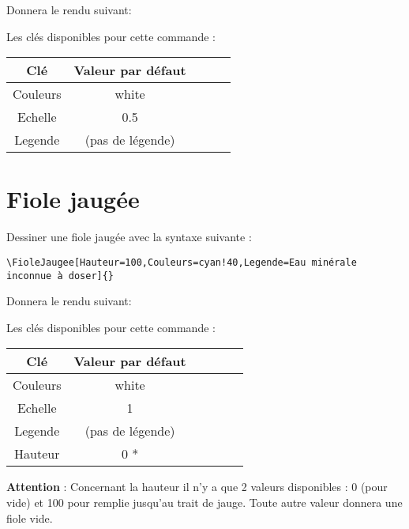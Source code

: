 \documentclass[a4paper,12pt,dvipsnames]{report}
\newcommand{\crh}{\\ \hline}
\newcommand{\important}[1]{%
\vspace{0.5cm}

\begin{imp} 
#1 
\end{imp}
\vspace{0.5cm}%
}
\begin{document}
Donnera le rendu suivant:
\begin{center}
\Becher[Couleurs=magenta!88,Echelle=1,Legende=bécher 2 contenant une solution de permanganate]{}
\end{center}

\vspace{1cm}

Les clés disponibles pour cette commande :
\begin{center}
\begin{tabularx}{0.5\textwidth}{|C|C|}
\hline 
\textbf{Clé} & \textbf{Valeur par défaut} \crh
Couleurs & white \crh
Echelle & 0.5 \crh
Legende & {} (pas de légende) \crh
\end{tabularx}
\end{center}

\newpage
\section{Fiole jaugée}

Dessiner une fiole jaugée avec la syntaxe suivante :
\vspace{2cm}

\begin{lstlisting}[style=A]
\FioleJaugee[Hauteur=100,Couleurs=cyan!40,Legende=Eau minérale inconnue à doser]{}
\end{lstlisting}
\vspace{2cm}

Donnera le rendu suivant:
\begin{center}
\FioleJaugee[Hauteur=100,Couleurs=cyan!40,Legende=Eau minérale inconnue à doser]{} \FioleJaugee[Hauteur=20,Couleurs=cyan!40,Legende=Ceci est une fiole vide]{}

\end{center}
\vspace{2cm}


Les clés disponibles pour cette commande :
\begin{center}
\begin{tabularx}{0.5\textwidth}{|C|C|}
\hline 
\textbf{Clé} & \textbf{Valeur par défaut} \crh
Couleurs & white \crh
Echelle & 1 \crh
Legende & {} (pas de légende) \crh
Hauteur & 0 *\crh
\end{tabularx}
\end{center}

\important{\textbf{Attention} : Concernant la hauteur il n'y a que 2 valeurs disponibles : 0 (pour vide) et 100 pour remplie jusqu'au trait de jauge. Toute autre valeur donnera une fiole vide.}
\end{document}
